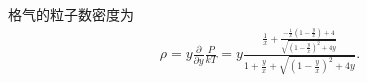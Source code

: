 \documentclass{assignment}
\begin{document}
\begin{pf}
    格气的粒子数密度为
    \begin{align}
        \rho=y\frac{\partial}{\partial y}\frac{P}{kT}=y\frac{\frac{1}{x}+\frac{-\frac{1}{x}\left(1-\frac{y}{x}\right)+4}{\sqrt{(1-\frac{y}{x})^2+4y}}}{1+\frac{y}{x}+\sqrt{\left(1-\frac{y}{x}\right)^2+4y}}.
    \end{align}
\end{pf}
\end{document}
